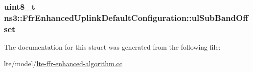 \subsubsection[{\texorpdfstring{ul\+Sub\+Band\+Offset}{ulSubBandOffset}}]{\setlength{\rightskip}{0pt plus 5cm}uint8\+\_\+t ns3\+::\+Ffr\+Enhanced\+Uplink\+Default\+Configuration\+::ul\+Sub\+Band\+Offset}\hypertarget{structns3_1_1FfrEnhancedUplinkDefaultConfiguration_ab705a1ef74cb03845e391eaed48388fa}{}\label{structns3_1_1FfrEnhancedUplinkDefaultConfiguration_ab705a1ef74cb03845e391eaed48388fa}


The documentation for this struct was generated from the following file\+:\begin{DoxyCompactItemize}
\item 
lte/model/\hyperlink{lte-ffr-enhanced-algorithm_8cc}{lte-\/ffr-\/enhanced-\/algorithm.\+cc}\end{DoxyCompactItemize}

